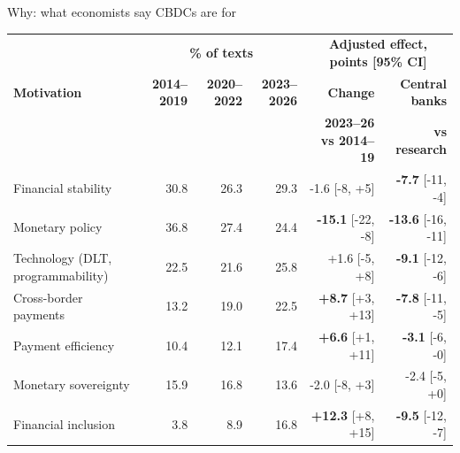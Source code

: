 \documentclass[aspectratio=169,10pt]{beamer}
\begin{document}
\begin{frame}{Why: what economists say CBDCs are for}
\scriptsize
\setlength{\tabcolsep}{4pt}
\begin{tabular}{@{}p{}rrrrr@{}}\toprule
 & \multicolumn{3}{c}{\textbf{\% of texts}} & \multicolumn{2}{c}{\textbf{Adjusted effect, points [95\% CI]}}\\
\textbf{Motivation} & \textbf{2014--2019} & \textbf{2020--2022} & \textbf{2023--2026} & \textbf{Change} & \textbf{Central banks}\\
 & & & & \textbf{2023--26 vs 2014--19} & \textbf{vs research}\\\midrule
Financial stability & \cellcolor{c1!46}30.8 & \cellcolor{c1!39}26.3 & \cellcolor{c1!43}29.3 & {-1.6} \tiny[-8, +5] & \textbf{-7.7} \tiny[-11, -4] \\
Monetary policy & \cellcolor{c1!55}36.8 & \cellcolor{c1!41}27.4 & \cellcolor{c1!36}24.4 & \textbf{-15.1} \tiny[-22, -8] & \textbf{-13.6} \tiny[-16, -11] \\
Technology (DLT, programmability) & \cellcolor{c1!33}22.5 & \cellcolor{c1!32}21.6 & \cellcolor{c1!38}25.8 & {+1.6} \tiny[-5, +8] & \textbf{-9.1} \tiny[-12, -6] \\
Cross-border payments & \cellcolor{c1!19}13.2 & \cellcolor{c1!28}19.0 & \cellcolor{c1!33}22.5 & \textbf{+8.7} \tiny[+3, +13] & \textbf{-7.8} \tiny[-11, -5] \\
Payment efficiency & \cellcolor{c1!15}10.4 & \cellcolor{c1!18}12.1 & \cellcolor{c1!26}17.4 & \textbf{+6.6} \tiny[+1, +11] & \textbf{-3.1} \tiny[-6, -0] \\
Monetary sovereignty & \cellcolor{c1!23}15.9 & \cellcolor{c1!25}16.8 & \cellcolor{c1!20}13.6 & {-2.0} \tiny[-8, +3] & {-2.4} \tiny[-5, +0] \\
Financial inclusion & \cellcolor{c1!5}3.8 & \cellcolor{c1!13}8.9 & \cellcolor{c1!25}16.8 & \textbf{+12.3} \tiny[+8, +15] & \textbf{-9.5} \tiny[-12, -7] \\

\end{tabular}
\end{frame}
\end{document}
